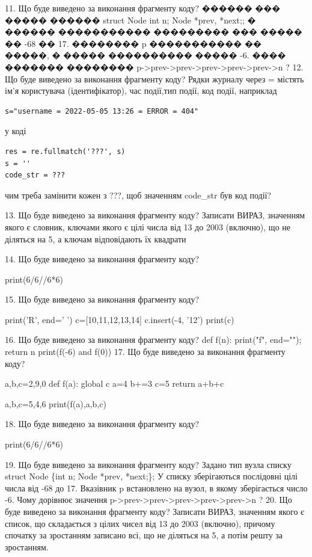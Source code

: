\documentclass[11pt]{article}
\begin{document}
11. Що буде виведено за виконання фрагменту коду?
������ ��� ����� ������ struct Node {int n; Node *prev, *next;};
� ������ ����������� ��������� ��� ����� �� -68 �� 17. �������� p ����������� �� �����, � ����� ���������� ����� -6.
���� ������� �������� p->prev->prev->prev->prev->prev->n ?
12. Що буде виведено за виконання фрагменту коду?
Рядки журналу через = містять ім'я користувача (ідентифікатор), час події,тип події, код події, наприклад
\begin{verbatim}
s="username = 2022-05-05 13:26 = ERROR = 404"
\end{verbatim}
у коді 
\begin{verbatim}
res = re.fullmatch('???', s) 
s = ''
code_str = ??? 
\end{verbatim}
чим треба замінити кожен з ???, щоб значенням code\_str був код події? 



13. Що буде виведено за виконання фрагменту коду?
Записати ВИРАЗ, значенням якого є словник, ключами якого є цілі числа від 13 до 2003 (включно), що не діляться на 5, а ключам відповідають їх квадрати 

14. Що буде виведено за виконання фрагменту коду?

print(6/6//6*6)

15. Що буде виведено за виконання фрагменту коду?

print('R', end=' ')
c=[10,11,12,13,14]
c.insert(-4, '12')
print(c)


16. Що буде виведено за виконання фрагменту коду?
def f(n): print("f", end=""); return n
   print(f(-6) and f(0))
17. Що буде виведено за виконання фрагменту коду?

a,b,c=2,9,0
def f(a):
global c    a=4
    b+=3
    c=5
    return a+b+c

a,b,c=5,4,6
print(f(a),a,b,c)

18. Що буде виведено за виконання фрагменту коду?

print(6/6//6*6)

19. Що буде виведено за виконання фрагменту коду?
Задано тип вузла списку
struct Node \{int n; Node *prev, *next;\};
У списку зберігаються послідовні цілі числа від -68 до 17. Вказівник p встановлено на вузол, в якому зберігається число -6.
Чому дорівнює значення p->prev->prev->prev->prev->prev->n ?
20. Що буде виведено за виконання фрагменту коду?
Записати ВИРАЗ, значенням якого є список, що складається з цілих чисел від 13 до 2003 (включно), причому спочатку за зростанням записано всі, що не діляться на 5, а потім решту за зростанням.
\end{document}
